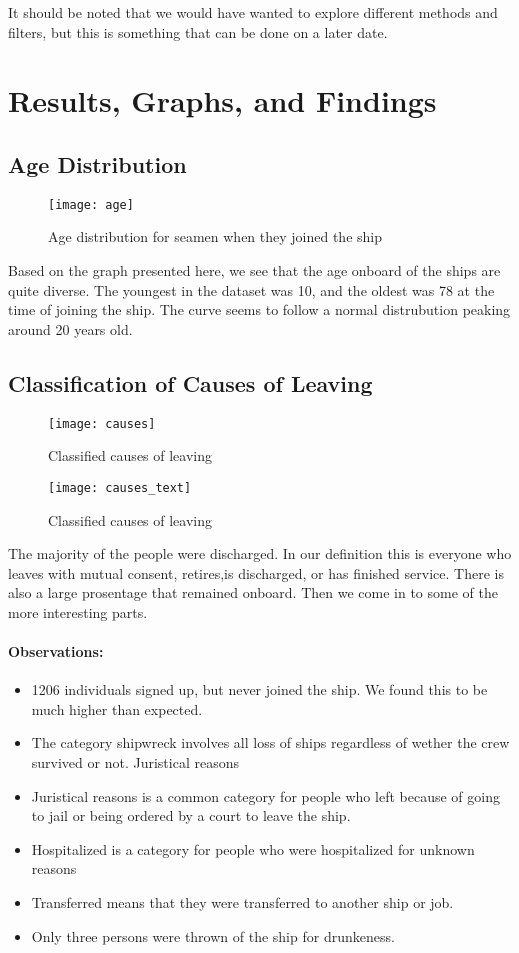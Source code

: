 \documentclass{article}
\begin{document}
It should be noted that we would have wanted to explore different methods and filters, but this is something that can be done on a later date.

\section{Results, Graphs, and Findings}

\subsection{Age Distribution}
\begin{figure}[H]
	\centering
    \texttt{[image: age]}
  	\caption{Age distribution for seamen when they joined the ship}
\end{figure}

Based on the graph presented here, we see that the age onboard of the ships are quite diverse. The youngest in the dataset was 10, and the oldest was 78 at the time of joining the ship. The curve seems to follow a normal distrubution peaking around 20 years old.

\subsection{Classification of Causes of Leaving}

\begin{figure}[H]
	\centering
    \texttt{[image: causes]}
  	\caption{Classified causes of leaving}
\end{figure}
\begin{figure}[H]
	\centering
    \texttt{[image: causes\_text]}
  	\caption{Classified causes of leaving}
\end{figure}

The majority of the people were discharged. In our definition this is everyone who leaves with mutual consent, retires,is discharged, or has finished service. There is also a large prosentage that remained onboard.
Then we come in to some of the more interesting parts.
\paragraph{Observations:}
\begin{itemize}
	\item 1206 individuals signed up, but never joined the ship. We found this to be much higher than expected.
	\item The category shipwreck involves all loss of ships regardless of wether the crew survived or not. Juristical reasons
	\item Juristical reasons is a common category for people who left because of going to jail or being ordered by a court to leave the ship.
	\item Hospitalized is a category for people who were hospitalized for unknown reasons
	\item Transferred means that they were transferred to another ship or job.
	\item Only three persons were thrown of the ship for drunkeness.
\end{itemize}
\end{document}
